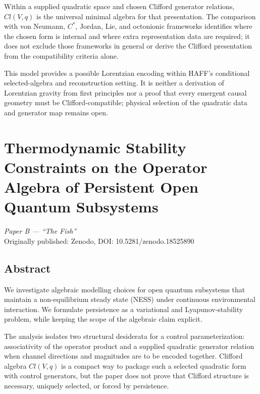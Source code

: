 \documentclass[12pt,a4paper,openany]{book}
\begin{document}
Within a supplied quadratic space and chosen Clifford generator relations, $Cl(V,q)$ is the universal minimal algebra for that presentation.
The comparison with von Neumann, $C^*$, Jordan, Lie, and octonionic frameworks identifies where the chosen form is internal and where extra representation data are required; it does not exclude those frameworks in general or derive the Clifford presentation from the compatibility criteria alone.

This model provides a possible Lorentzian encoding within HAFF's conditional selected-algebra and reconstruction setting.
It is neither a derivation of Lorentzian gravity from first principles nor a proof that every emergent causal geometry must be Clifford-compatible; physical selection of the quadratic data and generator map remains open.


\chapter{Thermodynamic Stability Constraints on the Operator Algebra of Persistent Open Quantum Subsystems}
\label{Q-chap:paperB}

\begin{center}
\textit{Paper B --- ``The Fish''}\\[0.5em]
Originally published: Zenodo, DOI: 10.5281/zenodo.18525890
\end{center}

\bigskip

\section*{Abstract}
We investigate algebraic modelling choices for open quantum subsystems
that maintain a non-equilibrium steady state (NESS) under continuous
environmental interaction.  We formulate persistence as a variational
and Lyapunov-stability problem, while keeping the scope of the algebraic
claim explicit.

The analysis isolates two structural desiderata for a control
parameterization: associativity of the operator product and a supplied
quadratic generator relation when channel directions and magnitudes are
to be encoded together.  Clifford algebra $Cl(V,q)$ is a compact way to
package such a selected quadratic form with control generators, but the
paper does not prove that Clifford structure is necessary, uniquely
selected, or forced by persistence.
\end{document}
